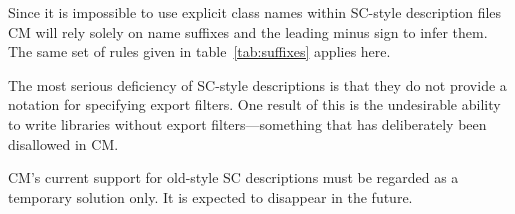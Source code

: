 \documentclass{article}
\begin{document}
Since it is impossible to use explicit class names within SC-style
description files CM will rely solely on name suffixes and the leading
minus sign to infer them.  The same set of rules given in
table~\ref{tab:suffixes} applies here.

The most serious deficiency of SC-style descriptions is that
they do not provide a notation for specifying export filters.  One
result of this is the undesirable ability to write libraries without
export filters---something that has deliberately been disallowed in
CM.

CM's current support for old-style SC descriptions must be regarded as
a temporary solution only.  It is expected to disappear in the future.

\cleardoublepage

\tableofcontents

\pagebreak


\end{document}
